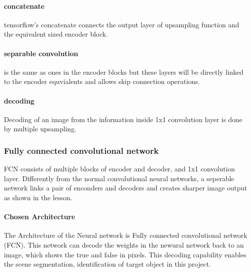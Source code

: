 \documentclass[paper=a4, fontsize=11pt]{scrartcl} %
\numberwithin{equation}{section} %
\numberwithin{figure}{section} %
\numberwithin{table}{section} %
\begin{document}
\paragraph{concatenate} tensorflow's concatenate connects the output layer of upsampling function and the equivalent sized encoder block.
\paragraph{separable convolution} is the same as ones in the encoder blocks but these layers will be directly linked to the encoder equvialents and allows skip connection operations.
\paragraph{decoding} Decoding of an image from the information inside 1x1 convolution layer is done by multiple upsampling.

\subsubsection{Fully connected convolutional network}
FCN consists of multiple blocks of encoder and decoder, and 1x1 convolution layer. Differently from the normal convolutional neural networks, a seperable network links a pair of enconders and decoders and creates sharper image output as shown in the lesson.

\paragraph{Chosen Architecture}
The Architecture of the Neural network is Fully connected convolutional network (FCN). This network can decode the weights in the newural network back to an image, which shows the true and false in pixels. This decoding capability enables the scene segmentation, identification of target object in this project.
\end{document}
